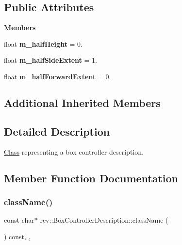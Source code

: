 \subsection*{Public Attributes}
\begin{Indent}\textbf{ Members}\par
\begin{DoxyCompactItemize}
\item 
\mbox{\label{classrev_1_1_box_controller_description_a71a4bbcad01a28f6ffa8f26b4013cb38}} 
float {\bfseries m\+\_\+half\+Height} = 0.
\item 
\mbox{\label{classrev_1_1_box_controller_description_aabb9ae5b5fe2ca0c5d55cbb0d384347a}} 
float {\bfseries m\+\_\+half\+Side\+Extent} = 1.
\item 
\mbox{\label{classrev_1_1_box_controller_description_acb50ed308b6545a02fb59e740c202b83}} 
float {\bfseries m\+\_\+half\+Forward\+Extent} = 0.
\end{DoxyCompactItemize}
\end{Indent}
\subsection*{Additional Inherited Members}


\subsection{Detailed Description}
\mbox{\hyperlink{struct_class}{Class}} representing a box controller description. 

\subsection{Member Function Documentation}
\mbox{\label{classrev_1_1_box_controller_description_a88d4d2d35a8f8d38b1dd90f33dba96bd}} 
\subsubsection{\texorpdfstring{className()}{className()}}
{\footnotesize\ttfamily const char$\ast$ rev\+::\+Box\+Controller\+Description\+::class\+Name (\begin{DoxyParamCaption}{ }\end{DoxyParamCaption}) const\hspace{0.3cm}{\ttfamily [inline]}, {\ttfamily [override]}, {\ttfamily [virtual]}}



